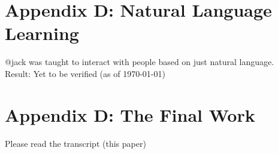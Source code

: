 \documentclass{article}
\begin{document}
	\section{Appendix D: Natural Language Learning}
	@jack was taught to interact with people based on just natural language.\\
	Result: Yet to be verified (as of \today)
	\section{Appendix D: The Final Work}
	Please read the transcript \cite{airefugeconv87} (this paper)
	
	
\end{document}
